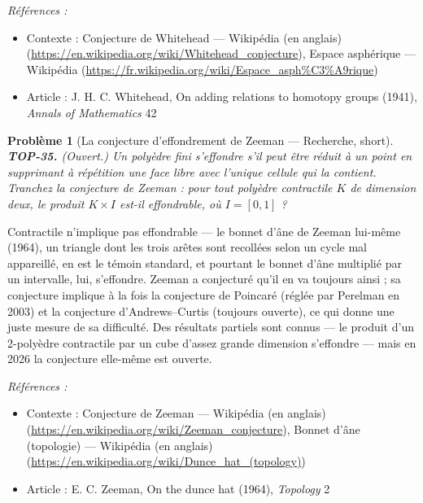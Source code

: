 \documentclass[11pt]{article}
\newtheorem{problem}{Problème}
\newenvironment{refs}{\par\small\noindent\emph{Références :}\begin{itemize}\setlength\itemsep{0pt}}{\end{itemize}\normalsize}
\begin{document}
\begin{refs}
\item Contexte : Conjecture de Whitehead --- Wikipédia (en anglais) (\url{https://en.wikipedia.org/wiki/Whitehead_conjecture}), Espace asphérique --- Wikipédia (\url{https://fr.wikipedia.org/wiki/Espace_asph%C3%A9rique})
\item Article : J. H. C. Whitehead, \og{} On adding relations to homotopy groups \fg{} (1941), \textit{Annals of Mathematics} 42
\end{refs}

\bigskip

\begin{problem}[{La conjecture d'effondrement de Zeeman --- Recherche, short}]
\textbf{TOP-35.} (Ouvert.) Un polyèdre fini \textit{s'effondre} s'il peut être réduit
à un point en supprimant à répétition une face libre avec l'unique cellule qui la contient. Tranchez la
conjecture de Zeeman : pour tout polyèdre contractile $ K $ de dimension deux, le produit
$ K \times I $ est-il effondrable, où $ I = [0,1] $ ?
\end{problem}

\noindent Contractile n'implique pas effondrable --- le bonnet d'âne de Zeeman lui-même (1964), un
triangle dont les trois arêtes sont recollées selon un cycle mal appareillé, en est le témoin standard, et
pourtant le bonnet d'âne multiplié par un intervalle, lui, s'effondre. Zeeman a conjecturé qu'il en va
toujours ainsi ; sa conjecture implique à la fois la conjecture de Poincaré (réglée par Perelman en 2003)
et la conjecture d'Andrews--Curtis (toujours ouverte), ce qui donne une juste mesure de sa difficulté. Des
résultats partiels sont connus --- le produit d'un 2-polyèdre contractile par un cube d'assez grande
dimension s'effondre --- mais en 2026 la conjecture elle-même est ouverte.

\begin{refs}
\item Contexte : Conjecture de Zeeman --- Wikipédia (en anglais) (\url{https://en.wikipedia.org/wiki/Zeeman_conjecture}), Bonnet d'âne (topologie) --- Wikipédia (en anglais) (\url{https://en.wikipedia.org/wiki/Dunce_hat_(topology)})
\item Article : E. C. Zeeman, \og{} On the dunce hat \fg{} (1964), \textit{Topology} 2
\end{refs}

\bigskip
\end{document}
